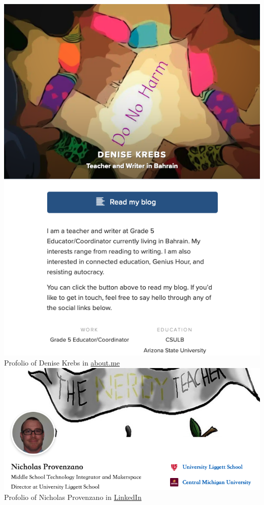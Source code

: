 \documentclass[12pt]{article}
\begin{document}
\includegraphics[scale = 0.3]{Photo1}Profolio of Denise Krebs in \href{https://about.me/mrsdkrebs}{about.me}\\


\includegraphics[scale = 0.3]{Photo2}
Profolio of Nicholas Provenzano in \href{https://www.linkedin.com/in/thenerdyteacher}{LinkedIn}\\
\end{document}
